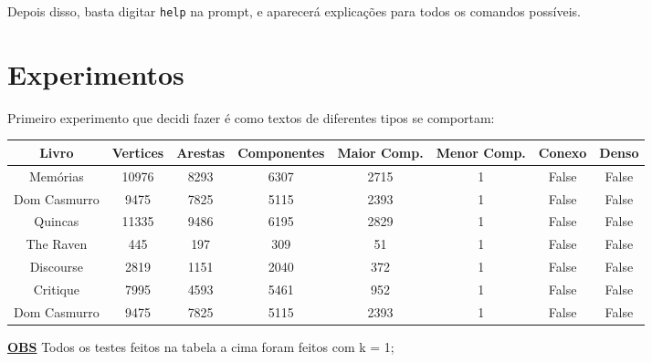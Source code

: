 \documentclass[12pt]{article}
\newcommand{\mytitle}[1]{\textbf{\underline{#1}}}
\begin{document}
Depois disso, basta digitar \texttt{help} na prompt, e aparecerá explicações para todos os comandos possíveis.

\section{Experimentos}

Primeiro experimento que decidi fazer é como textos de diferentes tipos se comportam:

\begin{center}
  \begin{tabular}{||c | c | c | c | c | c | c | c||} 
    \hline
    Livro & Vertices & Arestas & Componentes & Maior Comp. & Menor Comp. & Conexo & Denso \\ [0.5ex] 
    \hline\hline
    Memórias & 10976 & 8293 & 6307 & 2715 & 1 & False & False \\
    \hline
    Dom Casmurro & 9475 & 7825 & 5115 & 2393 & 1 & False & False \\ 
    \hline
    Quincas & 11335 & 9486 & 6195 & 2829 & 1 & False & False \\ 
    \hline
    The Raven & 445 & 197 & 309 & 51 & 1 & False & False \\ 
    \hline
    Discourse & 2819 & 1151 & 2040 & 372 & 1 & False & False \\ 
    \hline
    Critique & 7995 & 4593 & 5461 & 952 & 1 & False & False \\ 
    \hline
    Dom Casmurro & 9475 & 7825 & 5115 & 2393 & 1 & False & False \\ [1ex]
    \hline
  \end{tabular}
\end{center}

\mytitle{OBS} Todos os testes feitos na tabela a cima foram feitos com k = 1;
\end{document}
